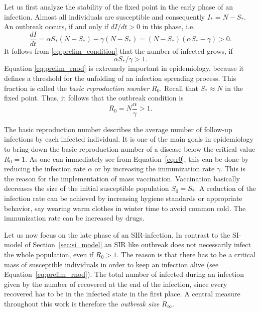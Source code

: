 Let us first analyze the stability of the fixed point in the early phase of an infection.
Almost all individuals are susceptible and consequently $I_*=N-S_*$.
An outbreak occurs, if and only if $dI/dt >0$ in this phase, i.e.
\begin{equation}\label{eq:prelim_condition}
\frac{dI}{dt}=\alpha S_* (N-S_*) - \gamma (N-S_*)=(N-S_*)(\alpha S_* -\gamma ) >0.
\end{equation}
It follows from \eqref{eq:prelim_condition} that the number of infected grows, if
\begin{equation}\label{eq:prelim_rnod}
\alpha S_* / \gamma >1.
\end{equation}
Equation \eqref{eq:prelim_rnod} is extremely important in epidemiology, because it defines a threshold for the unfolding of an infection spreading process.
This fraction is called the \emph{basic reproduction number} $R_0$.
Recall that $S_* \approx N$ in the fixed point.
Thus, it follows that the outbreak condition is
\begin{equation} \label{eq:r0}
R_0 = N \frac{\alpha }{\gamma } >1.
\end{equation}

The basic reproduction number describes the average number of follow-up infections by each infected individual.
It is one of the main goals in epidemiology to bring down the basic reproduction number of a disease below the critical value $R_0=1$.
As one can immediately see from Equation~\eqref{eq:r0}, this can be done by reducing the infection rate $\alpha $ or by increasing the immunization rate $\gamma $.
This is the reason for the implementation of mass vaccination.
Vaccination basically decreases the size of the initial susceptible population $S_0=S_*$.
A reduction of the infection rate can be achieved by increasing hygiene standards or appropriate behavior, say wearing warm clothes in winter time to avoid common cold.
The immunization rate can be increased by drugs.

Let us now focus on the late phase of an SIR-infection.
In contrast to the SI-model of Section~\ref{sec:si_model} an SIR like outbreak does not necessarily infect the whole population, even if $R_0>1$.
The reason is that there has to be a critical mass of susceptible individuals in order to keep an infection alive (see Equation~\eqref{eq:prelim_rnod}).
The total number of infected during an infection given by the number of recovered at the end of the infection, since every recovered has to be in the infected state in the first place.
A central measure throughout this work is therefore the \emph{outbreak size} $R_\infty$.

